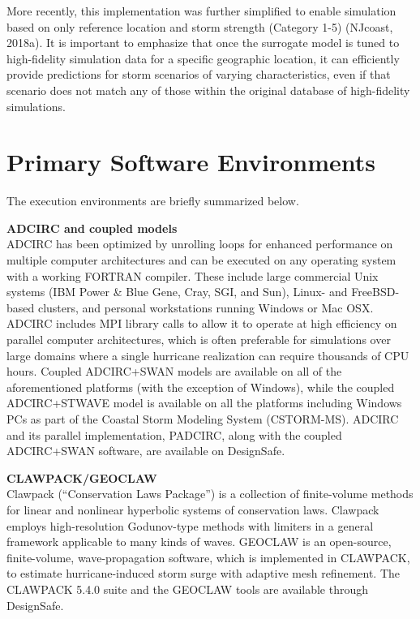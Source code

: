 More recently, this implementation was further simplified to enable simulation based on only reference location and storm strength (Category 1-5) (NJcoast, 2018a). It is important to emphasize that once the surrogate model is tuned to high-fidelity simulation data for a specific geographic location, it can efficiently provide predictions for storm scenarios of varying characteristics, even if that scenario does not match any of those within the original database of high-fidelity simulations. 

\section{Primary Software Environments}
\label{sec:storm_surge_tools}

The execution environments are briefly summarized below. 
\newline

\noindent\textbf{ADCIRC and coupled models} \\ADCIRC has been optimized by unrolling loops for enhanced performance on multiple computer architectures and can be executed on any operating system with a working FORTRAN compiler. These include large commercial Unix systems (IBM Power \& Blue Gene, Cray, SGI, and Sun), Linux- and FreeBSD-based clusters, and personal workstations running Windows or Mac OSX. ADCIRC includes MPI library calls to allow it to operate at high efficiency on parallel computer architectures, which is often preferable for simulations over large domains where a single hurricane realization can require thousands of CPU hours. Coupled ADCIRC+SWAN models are available on all of the aforementioned platforms (with the exception of Windows), while the coupled ADCIRC+STWAVE model is available on all the platforms including Windows PCs as part of the Coastal Storm Modeling System (CSTORM-MS). ADCIRC and its parallel implementation, PADCIRC, along with the coupled ADCIRC+SWAN software, are available on DesignSafe.
\newline

\noindent\textbf{CLAWPACK/GEOCLAW} \\Clawpack (“Conservation Laws Package”) is a collection of finite-volume methods for linear and nonlinear hyperbolic systems of conservation laws. Clawpack employs high-resolution Godunov-type methods with limiters in a general framework applicable to many kinds of waves. GEOCLAW is an open-source, finite-volume, wave-propagation software, which is implemented in CLAWPACK, to estimate hurricane-induced storm surge with adaptive mesh refinement. The CLAWPACK 5.4.0 suite and the GEOCLAW tools are available through DesignSafe.
\newline

